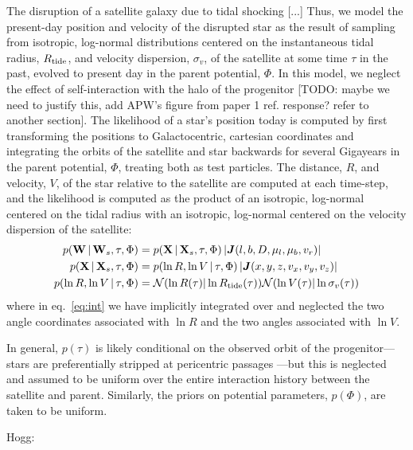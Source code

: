 \documentclass[letterpaper,12pt,preprint]{aastex}
\newcommand{\given}{\,|\,}
\newcommand{\jac}[1]{\left\vert \J{#1} \right\vert}
\newcommand{\D}{{\bf D}}
\newcommand{\W}{{\bf W}}
\newcommand{\X}{{\bf X}}
\newcommand{\J}{{\boldsymbol J}}
\newcommand{\rtide}{R_{\rm tide}}
\begin{document}
The disruption of a satellite galaxy due to tidal shocking [...] Thus, we model the present-day position and velocity of the disrupted star as the result of sampling from isotropic, log-normal distributions centered on the instantaneous tidal radius, $R_{\rm tide}$, and velocity dispersion, $\sigma_v$, of the satellite at some time $\tau$ in the past, evolved to present day in the parent potential, $\Phi$. In this model, we neglect the effect of self-interaction with the halo of the progenitor [TODO: maybe we need to justify this, add APW's figure from paper 1 ref. response? refer to another section]. The likelihood of a star's position today is computed by first transforming the positions to Galactocentric, cartesian coordinates and integrating the orbits of the satellite and star backwards for several Gigayears in the parent potential, $\Phi$, treating both as test particles. The distance, $R$, and velocity, $V$, of the star relative to the satellite are computed at each time-step, and the likelihood is computed as the product of an isotropic, log-normal centered on the tidal radius with an isotropic, log-normal centered on the velocity dispersion of the satellite:
\begin{align}
	p(\W \given \W_s, \tau, \Phi) &= p(\X \given \X_s, \tau, \Phi) \jac{(l,b,D,\mu_l,\mu_b,v_r)}\\
	p(\X \given \X_s, \tau, \Phi) &= p(\ln R, \ln V \given \tau, \Phi) \jac{(x,y,z,v_x,v_y,v_z)}\label{eq:int} \\
	p(\ln R, \ln V \given \tau, \Phi) &= \mathcal{N}(\ln R(\tau) | \ln \rtide(\tau))\mathcal{N}(\ln V(\tau) | \ln \sigma_v(\tau))
\end{align}
where in eq.~\ref{eq:int} we have implicitly integrated over and neglected the two angle coordinates associated with $\ln R$ and the two angles associated with $\ln V$.


In general, $p(\tau)$ is likely conditional on the observed orbit of the progenitor---stars are preferentially stripped at pericentric passages \citep{??}---but this is neglected and assumed to be uniform over the entire interaction history between the satellite and parent. Similarly, the priors on potential parameters, $p(\Phi)$, are taken to be uniform.

Hogg:
\end{document}

